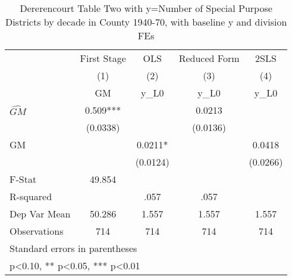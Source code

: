 \begin{table}[htbp]\centering
\def\sym#1{\ifmmode^{#1}\else\(^{#1}\)\fi}
\caption{Dererencourt Table Two with y=Number of Special Purpose Districts by decade in County 1940-70, with baseline y and division FEs}
\begin{tabular}{l*{4}{c}}
\toprule
                    & First Stage   &         OLS   &Reduced Form   &        2SLS   \\
                    &\multicolumn{1}{c}{(1)}&\multicolumn{1}{c}{(2)}&\multicolumn{1}{c}{(3)}&\multicolumn{1}{c}{(4)}\\
                    &\multicolumn{1}{c}{GM}&\multicolumn{1}{c}{y\_L0}&\multicolumn{1}{c}{y\_L0}&\multicolumn{1}{c}{y\_L0}\\
\midrule
$\hat{GM}$          &       0.509***&               &      0.0213   &               \\
                    &    (0.0338)   &               &    (0.0136)   &               \\
\addlinespace
GM                  &               &      0.0211*  &               &      0.0418   \\
                    &               &    (0.0124)   &               &    (0.0266)   \\
\midrule
F-Stat              &      49.854   &               &               &               \\
R-squared           &               &        .057   &        .057   &               \\
Dep Var Mean        &      50.286   &       1.557   &       1.557   &       1.557   \\
Observations        &         714   &         714   &         714   &         714   \\
\bottomrule
\multicolumn{5}{l}{\footnotesize Standard errors in parentheses}\\
\multicolumn{5}{l}{\footnotesize * p<0.10, ** p<0.05, *** p<0.01}\\
\end{tabular}
\end{table}
